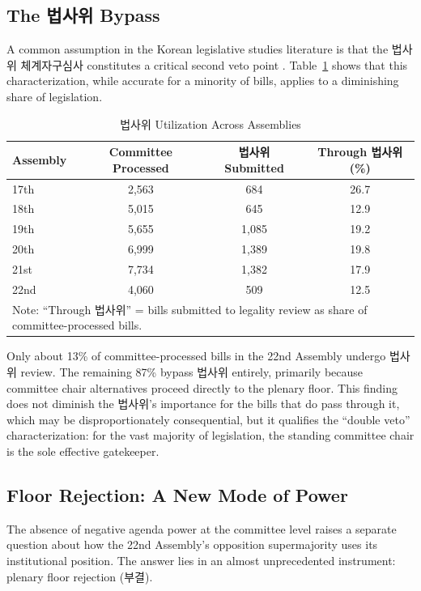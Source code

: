 \documentclass[11pt]{article}
\begin{document}
\subsection{The 법사위 Bypass}

A common assumption in the Korean legislative studies literature is that the 법사위 체계자구심사 constitutes a critical second veto point \citep{ko2017}. Table~\ref{tab:lawcom} shows that this characterization, while accurate for a minority of bills, applies to a diminishing share of legislation.

\begin{table}[htbp]
\centering
\caption{법사위 Utilization Across Assemblies}
\label{tab:lawcom}
\begin{tabular}{lccc}
\toprule
Assembly & Committee Processed & 법사위 Submitted & Through 법사위 (\%) \\
\midrule
17th & 2,563 & 684 & 26.7 \\
18th & 5,015 & 645 & 12.9 \\
19th & 5,655 & 1,085 & 19.2 \\
20th & 6,999 & 1,389 & 19.8 \\
21st & 7,734 & 1,382 & 17.9 \\
22nd & 4,060 & 509 & 12.5 \\
\bottomrule
\multicolumn{4}{l}{\footnotesize Note: ``Through 법사위'' = bills submitted to legality review as share of committee-processed bills.} \\
\end{tabular}
\end{table}

Only about 13\% of committee-processed bills in the 22nd Assembly undergo 법사위 review. The remaining 87\% bypass 법사위 entirely, primarily because committee chair alternatives proceed directly to the plenary floor. This finding does not diminish the 법사위's importance for the bills that do pass through it, which may be disproportionately consequential, but it qualifies the ``double veto'' characterization: for the vast majority of legislation, the standing committee chair is the sole effective gatekeeper.

\subsection{Floor Rejection: A New Mode of Power}

The absence of negative agenda power at the committee level raises a separate question about how the 22nd Assembly's opposition supermajority uses its institutional position. The answer lies in an almost unprecedented instrument: plenary floor rejection (부결).
\end{document}
